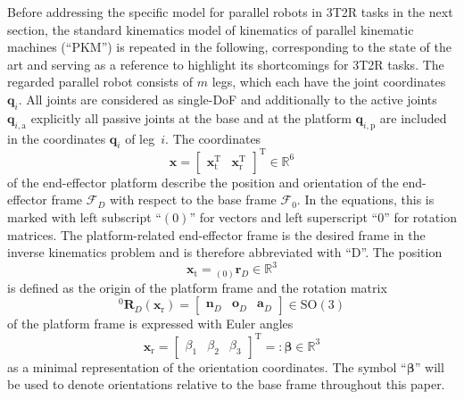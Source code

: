\documentclass[robotics,article,submit,moreauthors,pdftex]{Definitions/mdpi}
\newcommand{\bm}[1]{\boldsymbol{#1}}
\newcommand{\ortvek}[4]{{ }_{(#1)}{\boldsymbol{#2}}^{#3}_{#4} }
\newcommand{\vek}[3]{\boldsymbol{#1}^{#2}_{#3}}
\newcommand{\rotmat}[2]{{{ }^{#1}\boldsymbol{R}}_{#2}}
\newcommand{\transp}[0]{{\mathrm{T}}}
\newcommand{\ks}[1]{{\mathcal{F}}_{#1}}
\begin{document}
Before addressing the specific model for parallel robots in 3T2R tasks in the next section, the standard kinematics model of kinematics of parallel kinematic machines (``PKM'') is repeated in the following, corresponding to the state of the art \cite{Merlet2006,Gogu2008,BriotKha2015} and serving as a reference to highlight its shortcomings for 3T2R tasks.
The regarded parallel robot consists of $m$ legs, which each have the joint coordinates $\bm{q}_i$.
All joints are considered as single-DoF and additionally to the active joints $\bm{q}_{i,\mathrm{a}}$ explicitly all passive joints at the base and at the platform $\bm{q}_{i,\mathrm{p}}$ are included in the coordinates $\bm{q}_i$ of leg~$i$.
The coordinates
%
\begin{equation}
\bm{x}
=
\begin{bmatrix}
\bm{x}_{\mathrm{t}}^\transp & \bm{x}_{\mathrm{r}}^\transp
\end{bmatrix}^\transp
\in {\mathbb{R}}^{6}
\label{equ:x_def}
\end{equation}
%
of the end-effector platform describe the position and orientation of the end-effector frame $\ks{D}$ with respect to the base frame $\ks{0}$.
In the equations, this is marked with left subscript ``$(0)$'' for vectors and left superscript ``$0$'' for rotation matrices.
The platform-related end-effector frame is the desired frame in the inverse kinematics problem and is therefore abbreviated with ``D''.
The position 
%
\begin{equation}
\bm{x}_{\mathrm{t}}
=
\ortvek{0}{r}{}{D}
\in {\mathbb{R}}^{3}
\label{equ:xt_def}
\end{equation}
%
is defined as the origin of the platform frame and the rotation matrix
%
\begin{equation}
\rotmat{0}{D} (\bm{x}_{\mathrm{r}})
=
\begin{bmatrix}\vek{n}{}{D} & \vek{o}{}{D} & \vek{a}{}{D}\end{bmatrix} \in \mathrm{SO(3)}
\label{equ:xr_def_rotmat}
\end{equation}
%
of the platform frame is expressed with Euler angles
%
\begin{equation}
\bm{x}_{\mathrm{r}}
=
\begin{bmatrix}
\beta_1 & \beta_2 & \beta_3
\end{bmatrix}^{\mathrm{T}}
=:
\bm{\beta}
\in {\mathbb{R}}^{3}
\label{equ:xr_def}
\end{equation} 
%
as a minimal representation of the orientation coordinates.
The symbol ``$\bm{\beta}$'' will be used to denote orientations relative to the base frame throughout this paper.
\end{document}
